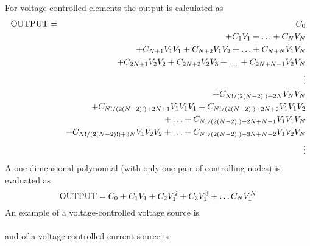 For voltage-controlled elements the output is calculated as
\begin{eqnarray}
{\rm OUTPUT} & = & C_0 \nonumber\\
         &   & + C_1V_1 + \ldots + C_NV_N\nonumber\\
         &   & + C_{N+1}V_1V_1 + C_{N+2}V_1V_2 + \ldots + C_{N+N}V_1V_N
               \nonumber\\
         &   & + C_{2N+1}V_2V_2 + C_{2N+2}V_2V_3 +\ldots + C_{2N+N-1}V_2V_N
               \nonumber\\
         &   & \vdots \nonumber\\
         &   & + C_{N!/(2(N-2)!)+2N}V_NV_N
               \nonumber\\
         &   & + C_{N!/(2(N-2)!)+2N+1}V_1V_1V_1 +
               C_{N!/(2(N-2)!)+2N+2}V_1V_1V_2\nonumber\\
         &   &\ \ \ \ \ \ \ \ \ + \ldots +
               C_{N!/(2(N-2)!)+2N+N-1}V_1V_1V_N
                     \nonumber\\
         &   & + C_{N!/(2(N-2)!)+3N}V_1V_2V_2 + \ldots +
               C_{N!/(2(N-2)!)+3N+N-2}V_1V_2V_N
                     \nonumber\\
         &   & \vdots\nonumber
\end{eqnarray}
A one dimensional polynomial (with only one pair of controlling nodes) is
evaluated as
\[
{\rm OUTPUT} = C_0 + C_1V_1 + C_2V_1^2 + C_3V_1^3 + \ldots C_NV_1^N
\]
An example of a voltage-controlled voltage source is\\[0.1in]
\hspace*{\fill} \\[0.1in]
and of a voltage-controlled current source is\\[0.1in]
\hspace*{\fill}\\[0.1in]

